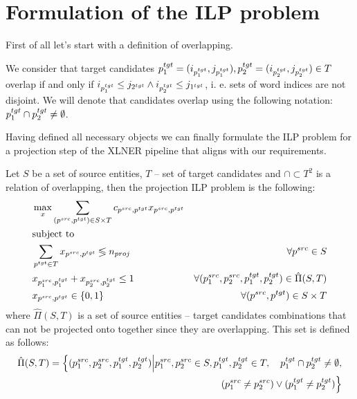 \section{Formulation of the ILP problem}
First of all let's start with a definition of overlapping.

\begin{definition} \label{def:overlapping}
  We consider that target candidates \linebreak
  \( p_1^{tgt} = (i_{p_1^{tgt}}, j_{p_1^{tgt}}), p_2^{tgt} = (i_{p_2^{tgt}}, j_{p_2^{tgt}}) \in T \) overlap if and only if
  \( i_{p_1^{tgt}} \leq j_{2^{tgt}} \land i_{p_2^{tgt}} \leq j_{1^{tgt}} \), i. e. sets of word indices are
  not disjoint. We will denote that candidates overlap using
  the following notation: \( p_1^{tgt} \cap p_2^{tgt} \neq \emptyset \).
\end{definition}

Having defined all necessary objects we can finally formulate the ILP problem for a
projection step of the XLNER pipeline that aligns with our requirements.

Let \( S \) be a set of source entities, \( T \) -- set of target candidates and \( \cap \subset T^2 \) is
a relation of overlapping, then the projection ILP problem is the following:
\begin{align}
  \label{eq:objective}
  & \max\limits_x \sum\limits_{(p^{src}, p^{tgt}) \in S \times T} c_{p^{src}, p^{tgt}} x_{p^{src}, p^{tgt}}                                             \\
  & \text{subject to} \notag                                                                                                                            \\
  \label{eq:num_proj_const}
  & \sum\limits_{p^{tgt} \in T} x_{p^{src}, p^{tgt}} \lessgtr n_{proj}                                      & \forall p^{src} \in S                     \\
  \label{eq:non_overlap_const}
  & x_{p_1^{src}, p_1^{tgt}} + x_{p_2^{src}, p_2^{tgt}} \leq 1
  & \forall (p_1^{src}, p_2^{src}, p_1^{tgt}, p_2^{tgt}) \in \hat{\Pi}(S, T)                                                                            \\
  \label{eq:binary_prog}
  & x_{p^{src}, p^{tgt}} \in \{ 0, 1 \}                                                                     & \forall (p^{src}, p^{tgt}) \in S \times T
\end{align}
where \( \hat{\Pi}(S, T) \) is a set of source entities -- target candidates combinations that can not be
projected onto together since they are overlapping. This set is defined as follows:
\begin{equation}  \label{eq:overlapping_set}
  \begin{aligned}
    \hat{\Pi}(S, T) = \Big\{ (p_1^{src}, p_2^{src}, p_1^{tgt}, p_2^{tgt}) \Big| p_1^{src}, p_2^{src} \in S, p_1^{tgt}, p_2^{tgt} \in T, \quad p_1^{tgt} \cap p_2^{tgt} \neq \emptyset, \\
    (p_1^{src} \neq p_2^{src}) \lor (p_1^{tgt} \neq p_2^{tgt}) \Big\}
  \end{aligned}
\end{equation}

